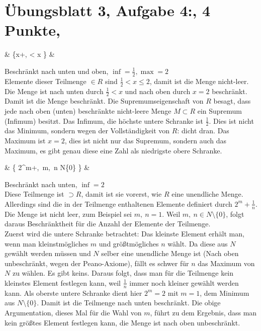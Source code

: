 \documentclass[12pt,a4paper]{report}
\begin{document}
	\section{Übungsblatt 3, Aufgabe 4:, 4 Punkte, \GruppeA}
		\begin{flalign*}
			&  \left\{x+,  < x  \right\} &
		\end{flalign*}
			Beschränkt nach unten und oben, $\inf = \frac{1}{2},\max = 2$\\
			Elemente dieser Teilmenge $\in R$ sind $ \frac{1}{2} < x \leq 2$, damit ist die Menge nicht-leer. Die Menge ist nach unten durch $ \frac{1}{2} < x $ und nach oben durch $ x = 2 $ beschränkt. Damit ist die Menge beschränkt. Die Supremumseigenschaft von $R$ besagt, dass jede nach oben (unten) beschränkte nicht-leere Menge $M \subset R$ ein Supremum (Infimum) besitzt. Das Infimum, die höchste untere Schranke ist $\frac{1}{2}$. Dies ist nicht das Minimum, sondern  wegen der Vollständigkeit von $R$: dicht dran. Das Maximum ist $x=2$, dies ist nicht nur das Supremum, sondern auch das Maximum, es gibt genau diese eine Zahl als niedrigste obere Schranke.\\
		\begin{flalign*}
			&  \left\{ 2^m+,~m,~n \in N\setminus\{0\} \right\} & 
		\end{flalign*}
			Beschränkt nach unten, $\inf = 2$\\ 
			Diese Teilmenge ist $\supset R$, damit ist sie vorerst, wie $R$ eine unendliche Menge. Allerdings sind die in der Teilmenge enthaltenen Elemente definiert durch $2^m+\frac{1}{n}$. Die Menge ist nicht leer, zum Beispiel sei $m,~n=1$. Weil $m,~n \in N \setminus \{0\}$, folgt daraus Beschränktheit für die Anzahl der Elemente der Teilmenge. \\
			Zuerst wird die untere Schranke betrachtet: Das kleinste Element erhält man, wenn man kleinstmögliches $m$ und größtmögliches $n$ wählt. Da diese aus $N$ gewählt werden müssen und $N$ selber eine unendliche Menge ist (Nach oben unbeschränkt, wegen der Peano-Axiome), fällt es schwer für $n$ das Maximum von $N$ zu wählen. Es gibt keins. Daraus folgt, dass man für die Teilmenge kein kleinstes Element festlegen kann, weil $\frac{1}{n}$ immer noch kleiner gewählt werden kann. Als oberste untere Schranke dient hier $2^m = 2$ mit $m=1$, dem Minimum aus $N \setminus \{0\}$. Damit ist die Teilmenge nach unten beschränkt. Die obige Argumentation, dieses Mal für die Wahl von $m$, führt zu dem Ergebnis, dass man kein größtes Element festlegen kann, die Menge ist nach oben unbeschränkt.
\end{document}
